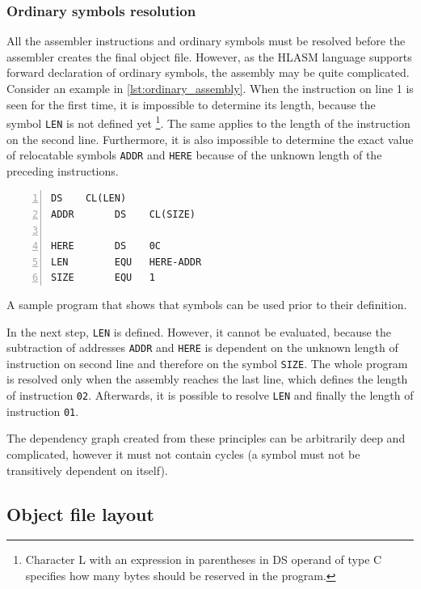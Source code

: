 \subsubsection{Ordinary symbols resolution}
\label{ordinary_resolution}
All the assembler instructions and ordinary symbols must be resolved before the assembler creates the final object file. However, as the HLASM language supports forward declaration of ordinary symbols, the assembly may be quite complicated. Consider an example in \cref{lst:ordinary_assembly}. When the instruction on line 1 is seen for the first time, it is impossible to determine its length, because the symbol \verb|LEN| is not defined yet \footnote{Character L with an expression in parentheses in DS operand of type C specifies how many bytes should be reserved in the program.}. The same applies to the length of the instruction on the second line. Furthermore, it is also impossible to determine the exact value of relocatable symbols \verb|ADDR| and \verb|HERE| because of the unknown length of the preceding instructions.

\begin{listing}[t]
	\begin{Verbatim}[numbers=left]
           DS    CL(LEN)
ADDR       DS    CL(SIZE)

HERE       DS    0C
LEN        EQU   HERE-ADDR
SIZE       EQU   1
	\end{Verbatim}
	\caption{A sample program that shows that symbols can be used prior to their definition.}
	\label{lst:ordinary_assembly}
\end{listing}


In the next step, \verb|LEN| is defined. However, it cannot be evaluated, because the subtraction of addresses \verb|ADDR| and \verb|HERE| is dependent on the unknown length of instruction on second line and therefore on the symbol \verb|SIZE|. The whole program is resolved only when the assembly reaches the last line, which defines the length of instruction \verb|02|. Afterwards, it is possible to resolve \verb|LEN| and finally the length of instruction \verb|01|.

The dependency graph created from these principles can be arbitrarily deep and complicated, however it must not contain cycles (a symbol must not be transitively dependent on itself).

\subsection{Object file layout}

